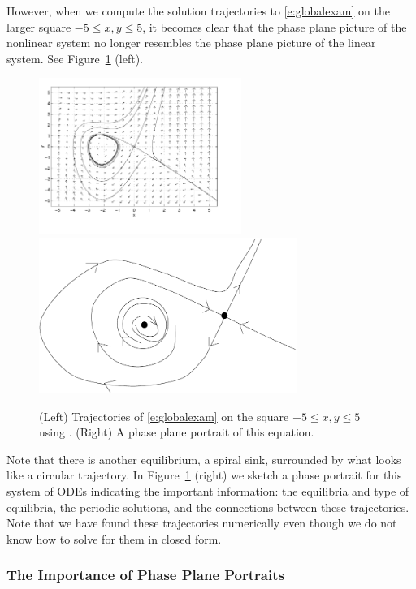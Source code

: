 \documentclass{ximera}
\begin{document}
However, when we compute the solution trajectories to
\eqref{e:globalexam} on the larger square $-5\leq x,y\leq 5$, it
becomes clear that the phase plane picture of 
the nonlinear
system no longer resembles the phase plane picture of the linear
system.  See Figure~\ref{F:globalb} (left).
\begin{figure}[htb]
           \centerline{%
	   \includegraphics[height=2.0in]{../figures/globalb.pdf}
           \includegraphics[height=2.0in]{../figures/globalc.pdf}}
           \caption{(Left) Trajectories of \protect\eqref{e:globalexam} 
on the square $-5\leq x,y \leq 5$ using {\pplane}. (Right) A
phase plane portrait of this equation.}
           \label{F:globalb}
\end{figure}
Note that there is another equilibrium, a spiral sink,
surrounded by what looks like a circular trajectory.  In 
Figure~\ref{F:globalb} (right) we sketch a phase portrait for 
this system of ODEs indicating the important information: 
the equilibria and type of equilibria, the periodic solutions,
and the connections between these trajectories.  Note that we have found
these trajectories numerically even though we do not know how to solve for
them in closed form.

\subsubsection*{The Importance of Phase Plane Portraits}
\end{document}
